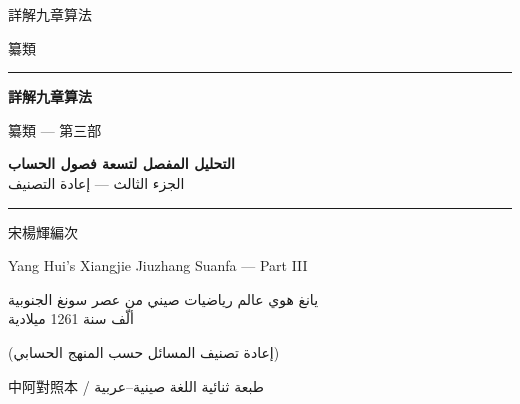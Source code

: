 \documentclass[11pt,a4paper]{article}
\begin{document}
\begin{titlepage}
\begin{center}
\vspace*{1.5cm}

{\fontsize{12}{16}\selectfont 詳解九章算法}

\vspace{0.8cm}

{\fontsize{10}{14}\selectfont 纂類}

\vspace{1.5cm}

\rule{0.85\textwidth}{1.5pt}

\vspace{0.8cm}

{\fontsize{26}{34}\selectfont\bfseries\color{titlecolor} 詳解九章算法}

\vspace{0.4cm}

{\fontsize{14}{20}\selectfont\color{notecolor} 纂類 --- 第三部}

\vspace{0.6cm}

{\fontsize{18}{24}\selectfont\arabicfont\beginR\color{titlecolor}
\textbf{التحليل المفصل لتسعة فصول الحساب}\\[0.3cm]
{\large الجزء الثالث --- إعادة التصنيف}\endR}

\vspace{0.8cm}

\rule{0.85\textwidth}{1.5pt}

\vspace{1.5cm}

{\fontsize{12}{16}\selectfont 宋\quad 楊輝\quad 編次}

\vspace{0.3cm}

{\fontsize{10}{14}\selectfont\color{notecolor} Yang Hui's Xiangjie Jiuzhang Suanfa --- Part III}

\vspace{0.8cm}

{\fontsize{11}{15}\selectfont\arabicfont\beginR\color{notecolor}
يانغ هوي \textbullet{} عالم رياضيات صيني من عصر سونغ الجنوبية\\
ألّف سنة 1261 ميلادية
\endR}

\vspace{1.5cm}

{\fontsize{10}{14}\selectfont\color{notecolor}
(إعادة تصنيف المسائل حسب المنهج الحسابي)}

\vfill

{\small 中阿對照本 / طبعة ثنائية اللغة صينية--عربية}

\end{center}
\end{titlepage}
\end{document}
